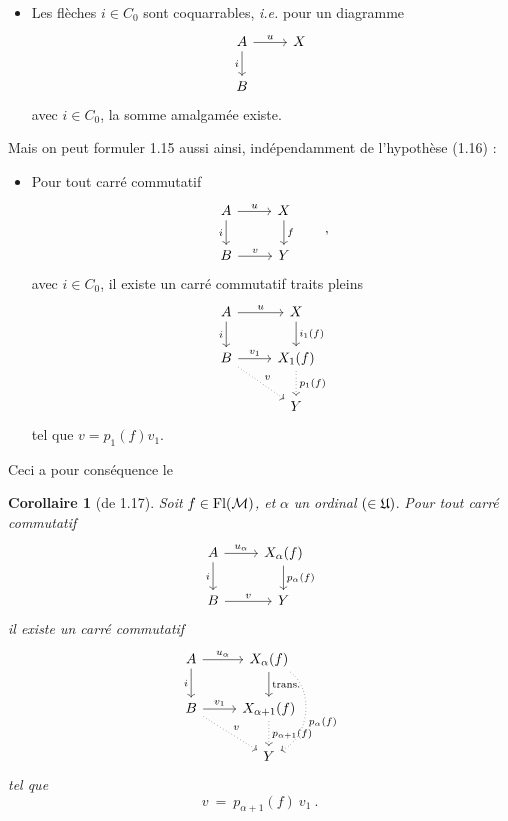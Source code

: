 \begin{itemize}[leftmargin=5em, labelwidth=4em, labelsep=1em, align=left]
\item[(1.16)] Les flèches $i \in C_0$ sont coquarrables, \textit{i.e.} pour un diagramme
\[
\begin{tikzcd}
A \arrow[r, "u"] \arrow[d, "i"'] & X \\
B &
\end{tikzcd}
\]
avec $i \in C_0$, la somme amalgamée existe.
\end{itemize}

Mais on peut formuler 1.15 aussi ainsi, indépendamment de l'hypothèse (1.16) :

\begin{itemize}[leftmargin=5em, labelwidth=4em, labelsep=1em, align=left]
\item[(1.17)] Pour tout carré commutatif
\[
\begin{tikzcd}
A \arrow[r, "u"] \arrow[d, "i"'] & X \arrow[d, "f"] \\
B \arrow[r, "v"] & Y
\end{tikzcd}
\qquad ,
\]
avec $i \in C_0$, il existe un carré commutatif traits pleins
\[
\begin{tikzcd}
A \arrow[r, "u"] \arrow[d, "i"'] & X \arrow[d, "i_1(f)"] \\
B \arrow[r, "v_1"] \arrow[dr, dotted, "v"] & X_1(f) \arrow[d, dotted, "p_1(f)"] \\
 & Y
\end{tikzcd}
\]
tel que $v = p_1(f)v_1$.
\end{itemize}

Ceci a pour conséquence le

\textbf{Corollaire 1} (de 1.17). \textit{Soit} $f \in \mathrm{Fl}(\mathcal{M})$\textit{, et} $\alpha$ \textit{un ordinal} $(\in \mathfrak{U})$. \textit{Pour tout carré commutatif}
\[
\begin{tikzcd}
A \arrow[r, "u_\alpha"] \arrow[d, "i"'] & X_\alpha(f) \arrow[d, "p_\alpha(f)"] \\
B \arrow[r, "v"] & Y
\end{tikzcd}
\]
\textit{il existe un carré commutatif}
\[
\begin{tikzcd}
A \arrow[r, "u_\alpha"] \arrow[d, "i"'] & X_\alpha(f) \arrow[d, "\text{trans.}"] \arrow[dd, dotted, bend left=60, "p_\alpha(f)"] \\
B \arrow[r, "v_1"] \arrow[dr, dotted, "v"] & X_{\alpha+1}(f) \arrow[d, dotted, "p_{\alpha+1}(f)"] \\
 & Y
\end{tikzcd}
\]
\textit{tel que}
\[
v \ = \ p_{\alpha+1}(f)\ v_1 \ .
\]

